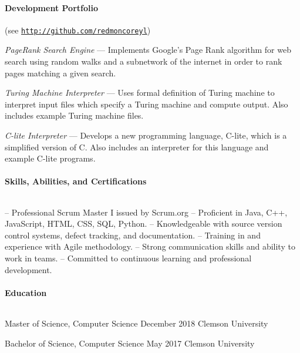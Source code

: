 \documentclass{article}
\begin{document}
	\paragraph{Development Portfolio} \hfill (see \href{http://github.com/redmoncoreyl}{\texttt{http://github.com/redmoncoreyl}})%

	\hangindent=0.5in
	\textit{PageRank Search Engine} --- Implements Google's Page Rank algorithm
	for web search using random walks and a subnetwork of the internet in order to
	rank pages matching a given search.

	\hangindent=0.5in
	\textit{Turing Machine Interpreter} --- Uses formal definition of Turing machine to
	interpret input files which specify a Turing machine and compute output. Also includes
	example Turing machine files.

	\hangindent=0.5in
	\textit{C-lite Interpreter} --- Develops a new programming language, C-lite, which
	is a simplified version of C. Also includes an interpreter for this language and
	example C-lite programs.

	\paragraph{Skills, Abilities, and Certifications} $ $

	\hangindent=0.4in
	-- Professional Scrum Master I issued by Scrum.org \newline
	-- Proficient in Java, C++, JavaScript, HTML, CSS, SQL, Python. \newline
	-- Knowledgeable with source version control systems, defect tracking, and documentation. \newline
	-- Training in and experience with Agile methodology. \newline
	-- Strong communication skills and ability to work in teams. \newline
	-- Committed to continuous learning and professional development.

	\paragraph{Education} $ $

	\hangindent=0.8in
	Master of Science, Computer Science \hfill December 2018 \newline
	Clemson University \newline

	\hangindent=0.8in
	Bachelor of Science, Computer Science \hfill May 2017 \newline
	Clemson University
	
\end{document}
